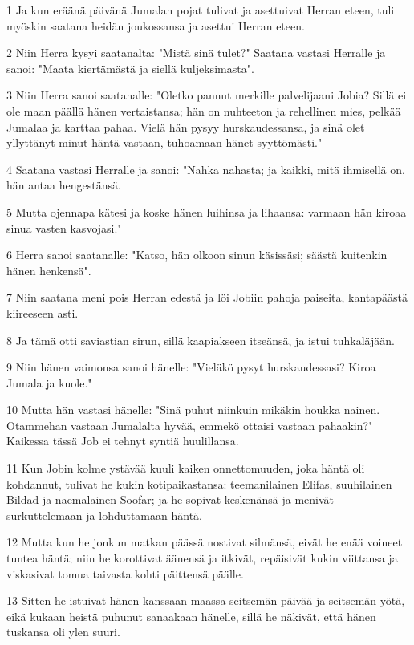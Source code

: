 \par 1 Ja kun eräänä päivänä Jumalan pojat tulivat ja asettuivat Herran eteen, tuli myöskin saatana heidän joukossansa ja asettui Herran eteen.
\par 2 Niin Herra kysyi saatanalta: "Mistä sinä tulet?" Saatana vastasi Herralle ja sanoi: "Maata kiertämästä ja siellä kuljeksimasta".
\par 3 Niin Herra sanoi saatanalle: "Oletko pannut merkille palvelijaani Jobia? Sillä ei ole maan päällä hänen vertaistansa; hän on nuhteeton ja rehellinen mies, pelkää Jumalaa ja karttaa pahaa. Vielä hän pysyy hurskaudessansa, ja sinä olet yllyttänyt minut häntä vastaan, tuhoamaan hänet syyttömästi."
\par 4 Saatana vastasi Herralle ja sanoi: "Nahka nahasta; ja kaikki, mitä ihmisellä on, hän antaa hengestänsä.
\par 5 Mutta ojennapa kätesi ja koske hänen luihinsa ja lihaansa: varmaan hän kiroaa sinua vasten kasvojasi."
\par 6 Herra sanoi saatanalle: "Katso, hän olkoon sinun käsissäsi; säästä kuitenkin hänen henkensä".
\par 7 Niin saatana meni pois Herran edestä ja löi Jobiin pahoja paiseita, kantapäästä kiireeseen asti.
\par 8 Ja tämä otti saviastian sirun, sillä kaapiakseen itseänsä, ja istui tuhkaläjään.
\par 9 Niin hänen vaimonsa sanoi hänelle: "Vieläkö pysyt hurskaudessasi? Kiroa Jumala ja kuole."
\par 10 Mutta hän vastasi hänelle: "Sinä puhut niinkuin mikäkin houkka nainen. Otammehan vastaan Jumalalta hyvää, emmekö ottaisi vastaan pahaakin?" Kaikessa tässä Job ei tehnyt syntiä huulillansa.
\par 11 Kun Jobin kolme ystävää kuuli kaiken onnettomuuden, joka häntä oli kohdannut, tulivat he kukin kotipaikastansa: teemanilainen Elifas, suuhilainen Bildad ja naemalainen Soofar; ja he sopivat keskenänsä ja menivät surkuttelemaan ja lohduttamaan häntä.
\par 12 Mutta kun he jonkun matkan päässä nostivat silmänsä, eivät he enää voineet tuntea häntä; niin he korottivat äänensä ja itkivät, repäisivät kukin viittansa ja viskasivat tomua taivasta kohti päittensä päälle.
\par 13 Sitten he istuivat hänen kanssaan maassa seitsemän päivää ja seitsemän yötä, eikä kukaan heistä puhunut sanaakaan hänelle, sillä he näkivät, että hänen tuskansa oli ylen suuri.

